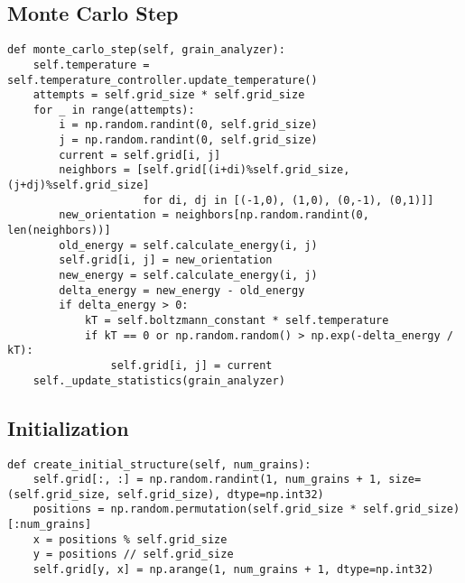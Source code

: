 \documentclass[12pt]{article}
\begin{document}
\subsection{Monte Carlo Step}
\begin{verbatim}
def monte_carlo_step(self, grain_analyzer):
    self.temperature = self.temperature_controller.update_temperature()
    attempts = self.grid_size * self.grid_size
    for _ in range(attempts):
        i = np.random.randint(0, self.grid_size)
        j = np.random.randint(0, self.grid_size)
        current = self.grid[i, j]
        neighbors = [self.grid[(i+di)%self.grid_size, (j+dj)%self.grid_size]
                     for di, dj in [(-1,0), (1,0), (0,-1), (0,1)]]
        new_orientation = neighbors[np.random.randint(0, len(neighbors))]
        old_energy = self.calculate_energy(i, j)
        self.grid[i, j] = new_orientation
        new_energy = self.calculate_energy(i, j)
        delta_energy = new_energy - old_energy
        if delta_energy > 0:
            kT = self.boltzmann_constant * self.temperature
            if kT == 0 or np.random.random() > np.exp(-delta_energy / kT):
                self.grid[i, j] = current
    self._update_statistics(grain_analyzer)
\end{verbatim}

\subsection{Initialization}
\begin{verbatim}
def create_initial_structure(self, num_grains):
    self.grid[:, :] = np.random.randint(1, num_grains + 1, size=(self.grid_size, self.grid_size), dtype=np.int32)
    positions = np.random.permutation(self.grid_size * self.grid_size)[:num_grains]
    x = positions % self.grid_size
    y = positions // self.grid_size
    self.grid[y, x] = np.arange(1, num_grains + 1, dtype=np.int32)
\end{verbatim}
\end{document}
